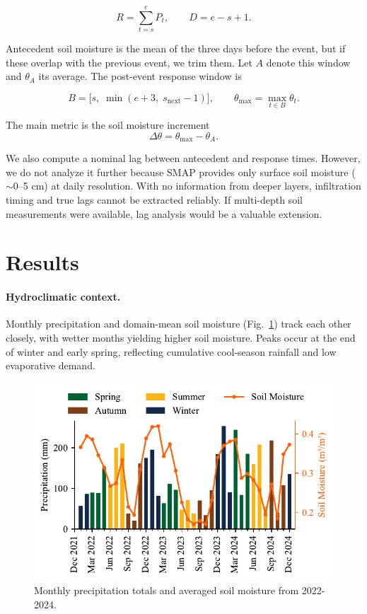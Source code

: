 \documentclass[8pt, twocolumn]{extarticle}
\begin{document}
\[
R = \sum_{t=s}^{e} P_t, 
\qquad 
D = e - s + 1.
\]

Antecedent soil moisture is the mean of the three days before the event, but if these overlap with the previous event, we trim them. Let \(A\) denote this window and \(\theta_A\) its average. The post-event response window is  

\[
B = \big[s,\; \min(e+3,\; s_{\mathrm{next}}-1)\big],
\qquad 
\theta_{\max} = \max_{t \in B} \theta_t .
\]

The main metric is the soil moisture increment  
\[
\Delta \theta = \theta_{\max} - \theta_A .
\]

We also compute a nominal lag between antecedent and response times. However, we do not analyze it further because SMAP provides only surface soil moisture (\(\sim\)0--5 cm) at daily resolution. With no information from deeper layers, infiltration timing and true lags cannot be extracted reliably. If multi-depth soil measurements were available, lag analysis would be a valuable extension.  

\section{Results}

\paragraph{Hydroclimatic context.}
Monthly precipitation and domain-mean soil moisture (Fig.~\ref{fig:monthly_precip_sm}) track each other closely, with wetter months yielding higher soil moisture. Peaks occur at the end of winter and early spring, reflecting cumulative cool-season rainfall and low evaporative demand.

\begin{figure}[!htbp]
  \centering
  \includegraphics[width=1\columnwidth]{monthly_precip_sm}
  \caption{Monthly precipitation totals and averaged soil moisture from 2022-2024.}
  \label{fig:monthly_precip_sm}
\end{figure}
\end{document}

